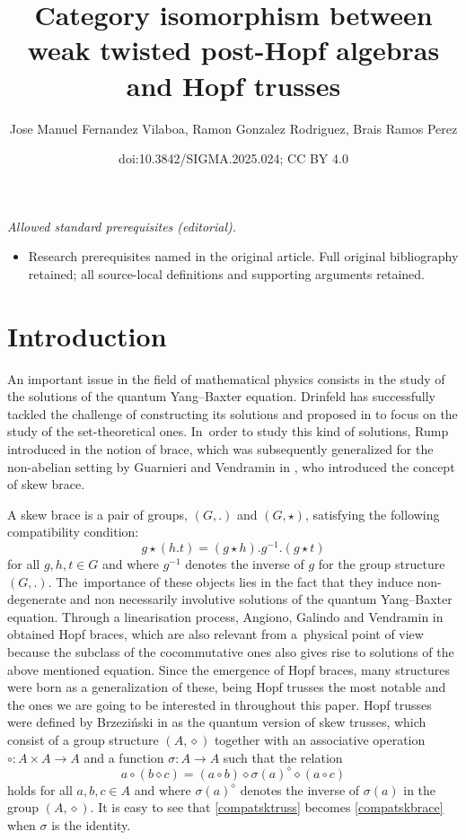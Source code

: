 \documentclass[10pt,a4paper]{amsart}
\title{Category isomorphism between weak twisted post-Hopf algebras and Hopf trusses}
\author{Jose Manuel Fernandez Vilaboa, Ramon Gonzalez Rodriguez, Brais Ramos Perez}
\date{doi:10.3842/SIGMA.2025.024; CC BY 4.0}
\numberwithin{equation}{section}
\begin{document}
\maketitle
\noindent\textit{Allowed standard prerequisites (editorial).}\begin{itemize}
\item Research prerequisites named in the original article. Full original bibliography retained; all source-local definitions and supporting arguments retained.
\end{itemize}\medskip
\section{Introduction}

An important issue in the field of mathematical physics consists in the study of the solutions of the quantum Yang--Baxter equation. Drinfeld has successfully tackled the challenge of constructing its solutions and proposed in \cite{DR1} to focus on the study of the set-theoretical ones. In~order to study this kind of solutions, Rump introduced in \cite{Rump} the notion of brace, which was subsequently generalized for the non-abelian setting by Guarnieri and Vendramin in \cite{GV}, who introduced the concept of skew brace.

A skew brace is a pair of groups, $(G,.)$ and $(G,\star)$, satisfying the following compatibility condition:
\begin{equation}\label{compatskbrace}
g\star(h. t)=(g\star h). g^{-1}. (g\star t)
\end{equation}
for all $g,h,t\in G$ and where $g^{-1}$ denotes the inverse of $g$ for the group structure $(G,.)$. The~importance of these objects lies in the fact that they induce non-degenerate and non necessarily involutive solutions of the quantum Yang--Baxter equation. Through a linearisation process, Angiono, Galindo and Vendramin in \cite{AGV} obtained Hopf braces, which are also relevant from a~physical point of view because the subclass of the cocommutative ones also gives rise to solutions of the above mentioned equation. Since the emergence of Hopf braces, many structures were born as a generalization of these, being Hopf trusses the most notable and the ones we are going to be interested in throughout this paper. Hopf trusses were defined by Brzezi\'nski in \cite{BRZ1} as the quantum version of skew trusses, which consist of a group structure $(A,\diamond)$ together with an associative operation $\circ\colon A\times A\rightarrow A$ and a function $\sigma\colon A\rightarrow A$ such that the relation
\begin{equation}\label{compatsktruss}
a\circ(b\diamond c)=(a\circ b)\diamond \sigma(a)^{\diamond}\diamond(a \circ c)
\end{equation}
holds for all $a,b,c\in A$ and where $\sigma(a)^{\diamond}$ denotes the inverse of $\sigma(a)$ in the group $(A,\diamond)$. It is easy to see that \eqref{compatsktruss} becomes \eqref{compatskbrace} when $\sigma$ is the identity.
\end{document}
